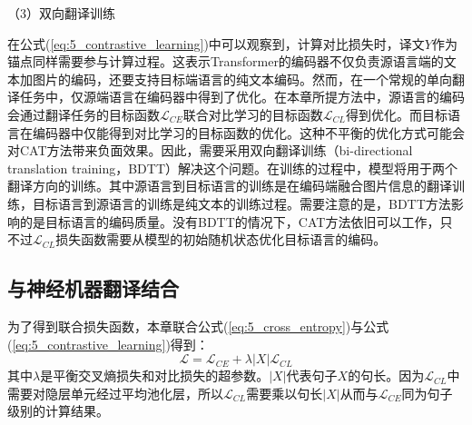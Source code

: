 {\sffamily （3）双向翻译训练}

在公式(\ref{eq:5_contrastive_learning})中可以观察到，计算对比损失时，译文$Y$作为锚点同样需要参与计算过程。这表示Transformer的编码器不仅负责源语言端的文本加图片的编码，还要支持目标端语言的纯文本编码。然而，在一个常规的单向翻译任务中，仅源端语言在编码器中得到了优化。在本章所提方法中，源语言的编码会通过翻译任务的目标函数$\mathcal{L}_{CE}$联合对比学习的目标函数$\mathcal{L}_{CL}$得到优化。而目标语言在编码器中仅能得到对比学习的目标函数的优化。这种不平衡的优化方式可能会对CAT方法带来负面效果。因此，需要采用双向翻译训练（bi-directional translation training，BDTT）解决这个问题。在训练的过程中，模型将用于两个翻译方向的训练。其中源语言到目标语言的训练是在编码端融合图片信息的翻译训练，目标语言到源语言的训练是纯文本的训练过程。需要注意的是，BDTT方法影响的是目标语言的编码质量。没有BDTT的情况下，CAT方法依旧可以工作，只不过$\mathcal{L}_{CL}$损失函数需要从模型的初始随机状态优化目标语言的编码。

\subsection{与神经机器翻译结合}
\label{sec:5_combine_with_nmt}

为了得到联合损失函数，本章联合公式(\ref{eq:5_cross_entropy})与公式(\ref{eq:5_contrastive_learning})得到：
\begin{equation}
    \mathcal{L}=\mathcal{L}_{CE} + \lambda|X|\mathcal{L}_{CL}
    \label{eq:5_combine_with_nmt}
\end{equation}
其中$\lambda$是平衡交叉熵损失和对比损失的超参数。$|X|$代表句子$X$的句长。因为$\mathcal{L}_{CL}$中需要对隐层单元经过平均池化层，所以$\mathcal{L}_{CL}$需要乘以句长$|X|$从而与$\mathcal{L}_{CE}$同为句子级别的计算结果。